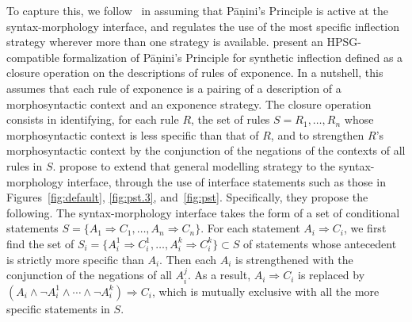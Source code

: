 \documentclass[output=paper]{langsci/langscibook}
\begin{document}
 To capture this, we follow \citet{Stump06} in assuming that Pāṇini's Principle is active at the syntax-morphology interface, and regulates the use of the most specific inflection strategy wherever more than one strategy is available. \citet{Crysmann14} present an HPSG-compatible formalization of Pāṇini's Principle for synthetic inflection defined as a closure operation on the descriptions of rules of exponence. In a nutshell, this assumes that each rule of exponence is a pairing of a description of a morphosyntactic context and an exponence strategy. The closure operation consists in identifying, for each rule $R$, the set of rules $S={R_1,\ldots,R_n}$ whose morphosyntactic context is less specific than that of $R$, and to strengthen $R$'s morphosyntactic context  by the conjunction of the negations of the contexts of all rules in $S$. \citet{Bonami16b} propose to extend that general modelling strategy to the syntax-morphology interface, through the use of interface statements such as those in Figures~\ref{fig:default}, \ref{fig:pst.3}, and~\ref{fig:pst}. Specifically, they propose the following. The syntax-morphology interface takes the form of a set of  conditional statements $S=\{A_1\Rightarrow C_1,\ldots, A_n\Rightarrow C_n\}$. For each statement $A_i\Rightarrow C_i$, we first find the set of $S_i=\{A^1_i\Rightarrow C^1_i,\ldots, A^k_i\Rightarrow C^k_i\}\subset S$ of statements whose antecedent is strictly more specific than $A_i$. Then each $A_i$ is strengthened with the conjunction of the negations of all $A^j_i$. As a result,  $A_i\Rightarrow C_i$ is replaced by $(A_i\wedge\neg A^1_i\wedge\cdots\wedge\neg A^k_i)\Rightarrow C_i$, which is mutually exclusive with all the more specific statements in $S$.
 
\end{document}
